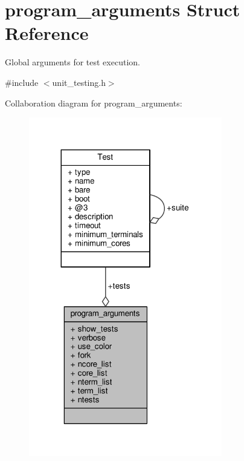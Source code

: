 \hypertarget{structprogram__arguments}{\section{program\-\_\-arguments Struct Reference}
\label{structprogram__arguments}
}


Global arguments for test execution.  




{\ttfamily \#include $<$unit\-\_\-testing.\-h$>$}



Collaboration diagram for program\-\_\-arguments\-:
\nopagebreak
\begin{figure}[H]
\begin{center}
\leavevmode
\includegraphics[width=239pt]{structprogram__arguments__coll__graph}
\end{center}
\end{figure}
